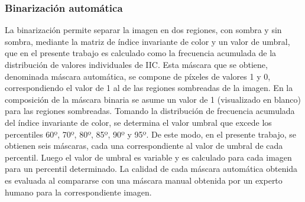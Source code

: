 \subsubsection{Binarización automática}
 La binarización permite separar la imagen en dos regiones, con sombra y sin sombra, mediante la matriz de índice invariante de color y un valor de umbral, que en el presente trabajo es calculado como la frecuencia acumulada de la distribución de valores individuales de IIC. Esta máscara que se obtiene, denominada máscara automática, se compone de píxeles de valores 1 y 0, correspondiendo el valor de 1 al de las regiones sombreadas de la imagen. En la composición de la máscara binaria se asume un valor de 1 (visualizado en blanco) para las regiones sombreadas. Tomando la distribución de frecuencia acumulada del índice invariante de color, se determina el valor umbral que excede los percentiles 60º, 70º, 80º, 85º, 90º y 95º. De este modo, en el presente trabajo, se obtienen seis máscaras, cada una correspondiente al valor de umbral de cada percentil. Luego el valor de umbral es variable y es calculado para cada imagen para un percentil determinado. La calidad de cada máscara automática obtenida es evaluada al compararse con una máscara manual obtenida por un experto humano para la correspondiente imagen.


